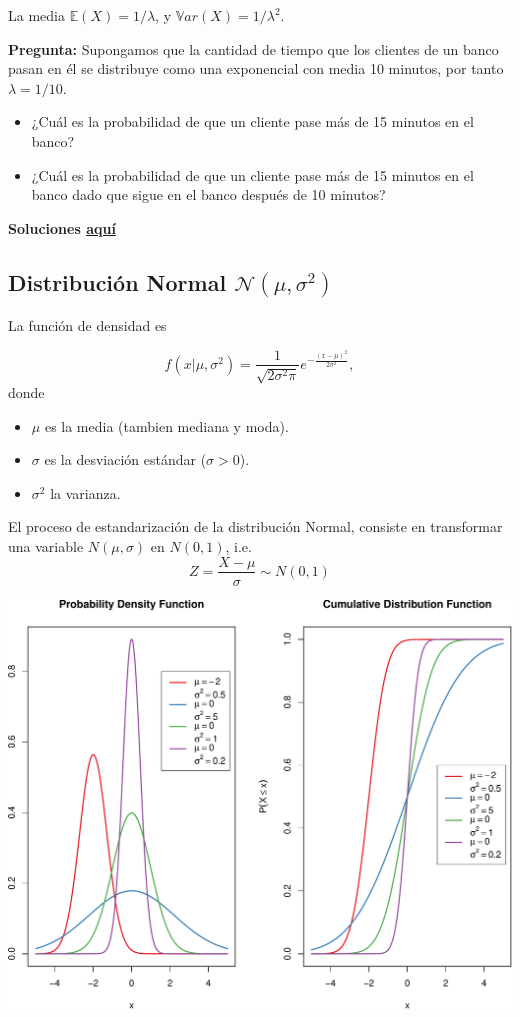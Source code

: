 \documentclass[]{article}
\def\tightlist{}
\numberwithin{equation}{section}
\begin{document}
La media \(\mathbb{E}(X) = 1/\lambda\), y
\(\mathbb{V}ar(X) = 1/\lambda^2\).

\textbf{Pregunta:} Supongamos que la cantidad de tiempo que los clientes
de un banco pasan en él se distribuye como una exponencial con media 10
minutos, por tanto \(\lambda=1/10\).

\begin{itemize}
\tightlist
\item
  ¿Cuál es la probabilidad de que un cliente pase más de 15 minutos en
  el banco?
\item
  ¿Cuál es la probabilidad de que un cliente pase más de 15 minutos en
  el banco dado que sigue en el banco después de 10 minutos?
\end{itemize}

\textbf{Soluciones \href{IntroSM_sol.html}{aquí}}

\subsection{\texorpdfstring{Distribución Normal
\(\mathcal{N}(\mu,\sigma^2)\)}{Distribución Normal \textbackslash{}mathcal\{N\}(\textbackslash{}mu,\textbackslash{}sigma\^{}2)}}\label{distribucion-normal-mathcalnmusigma2}

La función de densidad es

\[
f(x | \mu,\sigma^2) = \frac{1}{\sqrt{2\sigma^2\pi}} e ^{-\frac{(x-\mu)^2}{2\sigma^2}},
\] donde

\begin{itemize}
\tightlist
\item
  \(\mu\) es la media (tambien mediana y moda).
\item
  \(\sigma\) es la desviación estándar (\(\sigma>0\)).
\item
  \(\sigma^2\) la varianza.
\end{itemize}

El proceso de estandarización de la distribución Normal, consiste en
transformar una variable \(N(\mu,\sigma)\) en \(N(0,1)\), i.e. \[
Z = \frac{X-\mu}{\sigma} \sim N(0,1)
\]

\includegraphics{tema4_files/figure-latex/unnamed-chunk-11-1.pdf}
\end{document}
